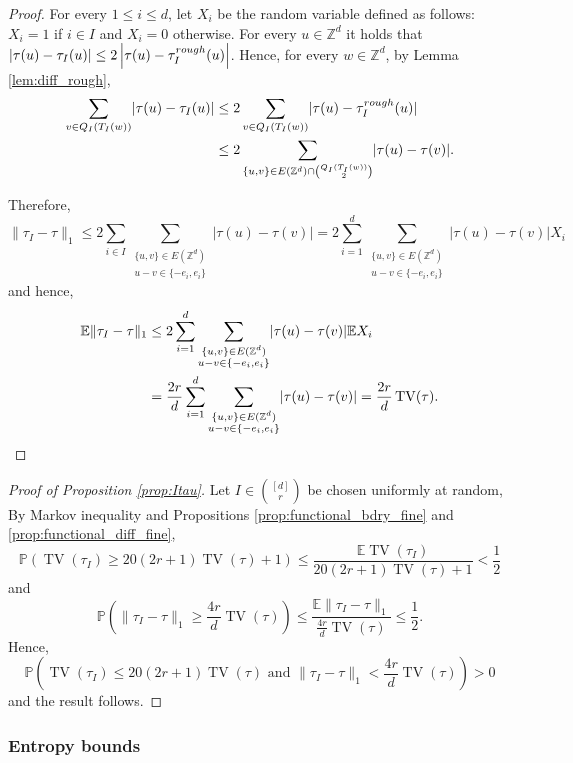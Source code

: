 \documentclass[11pt, reqno]{amsart}
\newcommand{\Z}{\mathbb{Z}}
\DeclareMathOperator{\TV}{TV}
\renewcommand{\P}{\mathbb{P}}
\numberwithin{equation}{section}
\begin{document}
\begin{proof}
For every $1\leq i\leq d$, let $X_i$ be the random variable defined as follows: $X_i=1$ if $i\in I$ and $X_i=0$ otherwise.
For every $u\in{\mathbb Z}^d$ it holds that
$\left\lvert\tau(u)-\tau_I(u)\right\rvert\leq 2\left\lvert\tau(u)-\tau^{\rm rough}_I(u)\right\rvert$.
Hence, for every $w\in{\mathbb Z}^d$, by Lemma \ref{lem:diff_rough},
\begin{align*}
\sum_{v\in Q_I(T_I(w))}\lvert\tau(u)-\tau_I(u)\rvert&\leq 2\sum_{v\in Q_I(T_I(w))}\lvert\tau(u)-\tau^{\rm rough}_I(u)\rvert\\
&\leq 2\sum_{\{u,v\}\in E(\Z^d)\cap\binom{Q_I(T_I(w))}{2}}\lvert\tau(u)-\tau(v)\rvert.
\end{align*}

Therefore,
$$
\lVert \tau_I-\tau\rVert_1
\leq 2\sum_{i\in I}\sum_{\substack{\{u,v\}\in E(\Z^d)\\ u-v\in\{-e_i,e_i\}}}\lvert \tau(u)-\tau(v)\rvert=2\sum_{i=1}^d \sum_{\substack{\{u,v\}\in E(\Z^d)\\ u-v\in\{-e_i,e_i\}}}\lvert \tau(u)-\tau(v)\rvert X_i
$$
and hence,
\begin{align*}
{\mathbb E}\lVert \tau_I-\tau\rVert_1
&\leq 2\sum_{i=1}^d \sum_{\substack{\{u,v\}\in E(\Z^d)\\ u-v\in\{-e_i,e_i\}}}\lvert \tau(u)-\tau(v)\rvert {\mathbb E}X_i\\
&=\frac{2r}{d}\sum_{i=1}^d\sum_{\substack{\{u,v\}\in E(\Z^d)\\ u-v\in\{-e_i,e_i\}}}\lvert \tau(u)-\tau(v)\rvert=\frac{2r}{d}\TV(\tau).
\qedhere\end{align*}
\end{proof}

\begin{proof}[Proof of Proposition \ref{prop:Itau}]
Let $I\in\binom{[d]}{r}$ be chosen uniformly at random, By Markov inequality and Propositions \ref{prop:functional_bdry_fine} and \ref{prop:functional_diff_fine},
$$
\P\left(\TV(\tau_I)\geq 20(2r+1)\TV(\tau)+1\right)\leq\frac{\mathbb{E} \TV(\tau_I)}{20(2r+1)\TV(\tau)+1}<\frac{1}{2} 
$$
and
$$
\P\left(\lVert \tau_I-\tau\rVert_1\geq\frac{4r}{d}\TV(\tau)\right)\leq\frac{{\mathbb E}\lVert \tau_I-\tau\rVert_1}{\frac{4r}{d}\TV(\tau)}\leq\frac{1}{2}. 
$$
Hence,
$$
\P\left(\TV(\tau_I)\leq 20(2r+1)\TV(\tau) \text{ and } \lVert \tau_I-\tau\rVert_1<\frac{4r}{d}\TV(\tau)\right)>0
$$
and the result follows.
\end{proof}

\subsubsection{Entropy bounds} 
\end{document}
